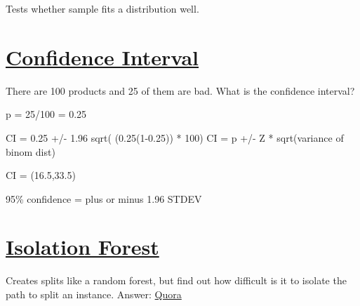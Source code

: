 \documentclass[11pt]{article}
\begin{document}
Tests whether sample fits a distribution well.

\section{\underline{Confidence Interval}}
\label{sec:orgb476252}

There are 100 products and 25 of them are bad. What is the confidence interval?

p = 25/100 = 0.25

CI = 0.25 +/- 1.96 sqrt( (0.25(1-0.25)) * 100)
CI = p +/- Z * sqrt(variance of binom dist)

CI = (16.5,33.5)

95\% confidence = plus or minus 1.96 STDEV

\section{\underline{Isolation Forest}}
\label{sec:orge7468f1}

Creates splits like a random forest, but find out how difficult is it to isolate the path to split an instance.
Answer: \href{https://www.quora.com/What-is-the-difference-between-random-forest-and-isolation-forest}{Quora}
\end{document}
